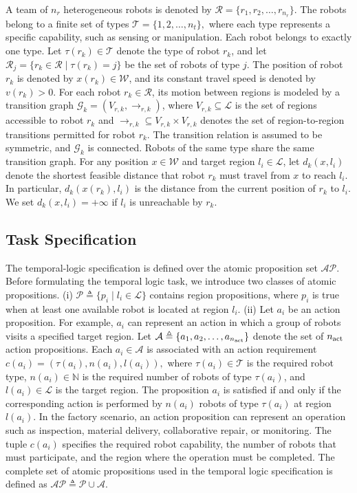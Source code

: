 \documentclass[lettersize,journal]{IEEEtran}
\theoremstyle{italiclemma}
\theoremstyle{italiclemma}
\theoremstyle{definition}
\begin{document}
A team of $n_r$ heterogeneous robots is denoted by $ \mathcal{R}=\{r_1,r_2,\ldots,r_{n_r}\}.$
The robots belong to a finite set of types $\mathcal{T}=\{1,2,\ldots,n_t\},$ where each type represents a specific capability, such as sensing or manipulation. Each robot belongs to exactly one type. Let $\tau(r_k)\in\mathcal{T}$ denote the type of robot $r_k$, and let $\mathcal{R}_j=\{r_k\in\mathcal{R}\mid \tau(r_k)=j\}$ be the set of robots of type $j$. The position of robot $r_k$ is denoted by $x(r_k)\in\mathcal W$, and its constant travel speed is denoted by $v(r_k)>0$. For each robot $r_k \in \mathcal{R}$, its motion between regions is modeled by a transition graph $\mathcal G_{k}=(V_{r,k},\xrightarrow{}_{r,k})$, where $V_{r,k}\subseteq\mathcal L$ is the set of regions accessible to robot $r_k$ and $\xrightarrow{}_{r,k} \subseteq V_{r,k}\times V_{r,k}$ denotes the set of region-to-region transitions permitted for robot $r_k$. The transition relation is assumed to be symmetric, and $\mathcal G_k$ is connected. Robots of the same type share the same transition graph.
For any position $x\in\mathcal W$ and target region $l_i\in\mathcal L$, let $d_k(x,l_i)$ denote the shortest feasible distance that robot $r_k$ must travel from $x$ to reach $l_i$. In particular, $d_k(x(r_k),l_i)$ is the distance from the current position of $r_k$ to $l_i$. We set $d_k(x,l_i)=+\infty$ if $l_i$ is unreachable by $r_k$.


\subsection{Task Specification}

The temporal-logic specification is defined over the atomic proposition set \(\mathcal{AP}\). 
Before formulating the temporal logic task, we introduce two classes of atomic propositions.  
(i) $ \mathcal{P} \triangleq \{p_i \mid l_i\in\mathcal{L}\}$  contains region propositions, where \(p_i\) is true when at least one available robot is located at
region $l_i$.
(ii) Let $a_i$ be an action proposition. For example, $a_i$ can represent an action in which a group of robots visits a specified target region.  Let
$ \mathcal{A}\triangleq \{a_1,a_2,\ldots,a_{n_{\rm act}}\} $
denote the set of $n_{\rm act}$ action propositions. Each $a_i\in\mathcal{A}$ is associated with an action requirement $ c(a_i)=(\tau(a_i),n(a_i),l(a_i)),  $
where $\tau(a_i)\in\mathcal{T}$ is the required robot type, $n(a_i)\in\mathbb{N}$ is the required number of robots of type $\tau(a_i)$, and $l(a_i)\in\mathcal{L}$ is the target region. The proposition $a_i$ is satisfied if and only if the corresponding action is performed by $n(a_i)$ robots of type $\tau(a_i)$ at region $l(a_i)$.
In the factory scenario, an action proposition can represent an operation such as inspection, material delivery, collaborative repair, or monitoring. The tuple $c(a_i)$ specifies the required robot capability, the number of robots that must participate, and the region where the operation must be completed.
The complete set of atomic propositions used in the temporal logic specification is defined as
$\mathcal{AP}\triangleq \mathcal{P}\cup\mathcal{A}$.
\end{document}

